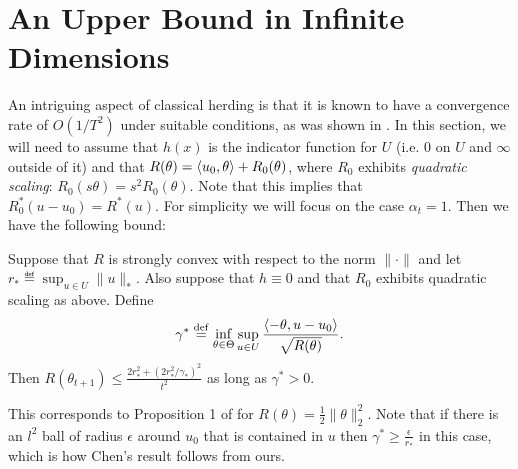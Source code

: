 \documentclass[paper.tex]{subfiles}
\begin{document}
\section{An Upper Bound in Infinite Dimensions}
\label{sec:chen-proofs}

An intriguing aspect of classical herding is that it is known to have a convergence rate of 
$O(1/T^2)$ under suitable conditions, as was shown in \citet{Chen:2010b}. In this section, 
we will need to assume that $h(x)$ is the indicator function for $U$ (i.e. $0$ on $U$ and 
$\infty$ outside of it) and that $R(\theta) = \left\langle u_0, \theta \right\rangle + R_0(\theta)$, where 
$R_0$ exhibits \emph{quadratic scaling}: $R_0(s\theta) = s^2R_0(\theta)$. Note that 
this implies that $R_0^*(u-u_0) = R^*(u)$.
For simplicity 
we will focus on the case $\alpha_t = 1$. Then we have 
the following bound:
\begin{theorem}
\label{thm:chen}
Suppose that $R$ is strongly convex with respect to the norm $\|\cdot\|$ and 
let $r_* \eqdef \sup_{u \in U} \|u\|_*$. Also suppose that $h \equiv 0$ and 
that $R_0$ exhibits quadratic scaling as above. Define 
\[ \gamma^* \stackrel{\mathrm{def}}{=} \inf_{\theta \in \Theta} \sup_{u \in U} \frac{\left\langle -\theta, u-u_0 \right\rangle}{\sqrt{R(\theta)}}. \]
Then $R(\theta_{t+1}) \leq \frac{2r_*^2+(2r_*^2/\gamma_*)^2}{t^2}$ as long 
as $\gamma^* > 0$.
\end{theorem}
This corresponds to Proposition 1 of \citet{Chen:2010b} for $R(\theta) = \frac{1}{2}\|\theta\|_2^2$. Note that if there is an $l^2$ ball of radius $\epsilon$ 
around $u_0$ that is contained in $u$ then $\gamma^* \geq \frac{\epsilon}{r_*}$ 
in this case, which is how Chen's result follows from ours.
\end{document}
